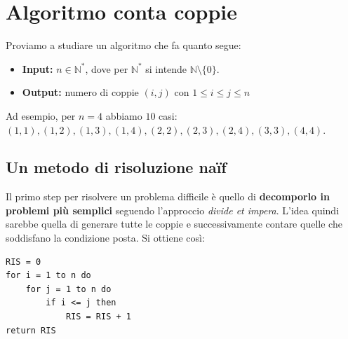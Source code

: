 \section{Algoritmo conta coppie}
Proviamo a studiare un algoritmo che fa quanto segue:
\begin{itemize}
    \item \textbf{Input:}  $n\in\mathbb{N}^*$, dove per $\mathbb{N}^*$ si intende $\mathbb{N}\setminus\{0\}$.
    \item \textbf{Output:} numero di coppie $(i,j)$ con $1\leq i\leq j\leq n$
\end{itemize}
Ad esempio, per $n=4$ abbiamo $10$ casi: $(1,1),(1,2),(1,3),(1,4),(2,2),(2,3),(2,4),(3,3),(4,4)$.

\subsection{Un metodo di risoluzione na\"if}
Il primo step per risolvere un problema difficile è quello di \textbf{decomporlo in problemi più semplici} seguendo l'approccio \emph{divide et impera}. L'idea quindi sarebbe quella di generare tutte le coppie e successivamente contare quelle che soddisfano la condizione posta. Si ottiene così:


\begin{lstlisting}[label=lst:Conta1, language=asd, caption={Conta1(n)}]
RIS = 0
for i = 1 to n do
    for j = 1 to n do
        if i <= j then
            RIS = RIS + 1
return RIS
\end{lstlisting}

